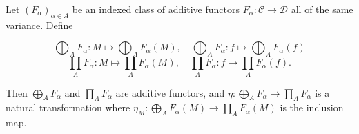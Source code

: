 Let $(F_\alpha)_{\alpha \in A}$ be an indexed class of additive functors $F_\alpha: \mathcal{C} \to \mathcal{D}$ all of the same variance. Define

$$\bigoplus_A F_\alpha : M \mapsto \bigoplus_A F_\alpha(M), \quad \bigoplus_A F_\alpha : f \mapsto \bigoplus_A F_\alpha(f)$$
$$\prod_A F_\alpha : M \mapsto \prod_A F_\alpha(M), \quad \prod_A F_\alpha : f \mapsto \prod_A F_\alpha(f).$$

Then $\bigoplus_A F_\alpha$ and $\prod_A F_\alpha$ are additive functors, and $\eta: \bigoplus_A F_\alpha \to \prod_A F_\alpha$ is a natural transformation where $\eta_M: \bigoplus_A F_\alpha(M) \to \prod_A F_\alpha(M)$ is the inclusion map.
